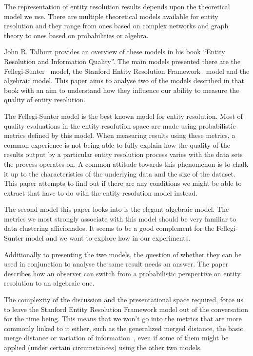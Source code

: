 \documentclass[journal]{IEEEtran}
\begin{document}
    The representation of entity resolution results depends upon the theoretical
    model we use.
    There are multiple theoretical models available for entity resolution and
    they range from ones based on complex networks and graph theory\cite{Li2020}
    to ones based on probabilities\cite{fs1969} or
    algebra\cite{Tal11,Ben2009Swoosh}.

    John R. Talburt provides an overview of these models in his book ``Entity
    Resolution and Information Quality''\cite{Tal11}.
    The main models presented there are the Fellegi-Sunter~\cite{fs1969} model,
    the Stanford Entity Resolution Framework~\cite{Ben2009Swoosh} model and the
    algebraic\cite{tal2007algebraic} model.
    This paper aims to analyse two of the models described in that book with an
    aim to understand how they influence our ability to measure the quality of
    entity resolution.

    The Fellegi-Sunter model is the best known model for entity resolution.
    Most of quality evaluations in the entity resolution space are made using
    probabilistic metrics defined by this model.
    When measuring results using these metrics, a common experience is not being
    able to fully explain how the quality of the results output by a particular
    entity resolution process varies with the data sets the process operates on.
    A common attitude towards this phenomenon is to chalk it up to the
    characteristics of the underlying data and the size of the dataset.
    This paper attempts to find out if there are any conditions we might be able
    to extract that have to do with the entity resolution model instead.

    The second model this paper looks into is the elegant algebraic model.
    The metrics we most strongly associate with this model should be very
    familiar to data clustering afficionados.
    It seems to be a good complement for the Fellegi-Sunter model and we want to
    explore how in our experiments.

    Additionally to presenting the two models, the question of whether they can
    be used in conjunction to analyse the same result needs an answer.
    The paper describes how an observer can switch from a probabilistic
    perspective on entity resolution to an algebraic one.

    The complexity of the discussion and the presentational space required,
    force us to leave the Stanford Entity Resolution Framework model out of the
    conversation for the time being.
    This means that we won't go into the metrics that are more commonly linked
    to it either, such as the generalized merged distance, the basic merge
    distance or variation of information~\cite{Men10}, even if some of them
    might be applied (under certain circumstances) using the other two models.
\end{document}
